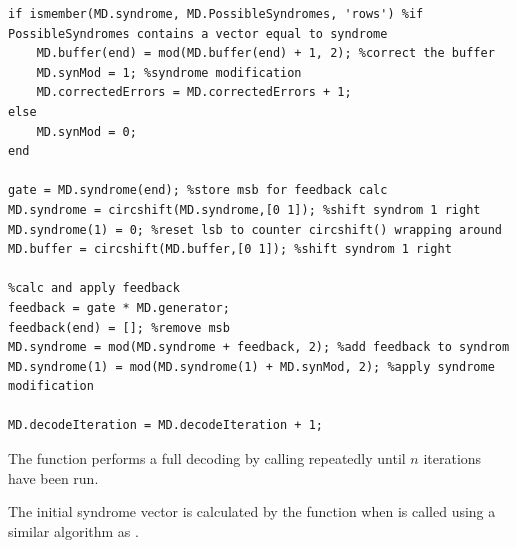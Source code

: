\documentclass[Main]{subfiles}
\begin{document}
\begin{lstlisting}[label={lst:decodeSingleStep},captionpos=b, caption=Decoding a single iteration.] 
%check if the syndrome vector corresponds to an error pattern with 1 as highest bit
if ismember(MD.syndrome, MD.PossibleSyndromes, 'rows') %if PossibleSyndromes contains a vector equal to syndrome
	MD.buffer(end) = mod(MD.buffer(end) + 1, 2); %correct the buffer
	MD.synMod = 1; %syndrome modification
	MD.correctedErrors = MD.correctedErrors + 1;
else
	MD.synMod = 0;
end
  
gate = MD.syndrome(end); %store msb for feedback calc
MD.syndrome = circshift(MD.syndrome,[0 1]); %shift syndrom 1 right
MD.syndrome(1) = 0; %reset lsb to counter circshift() wrapping around
MD.buffer = circshift(MD.buffer,[0 1]); %shift syndrom 1 right    

%calc and apply feedback
feedback = gate * MD.generator;
feedback(end) = []; %remove msb
MD.syndrome = mod(MD.syndrome + feedback, 2); %add feedback to syndrom
MD.syndrome(1) = mod(MD.syndrome(1) + MD.synMod, 2); %apply syndrome modification

MD.decodeIteration = MD.decodeIteration + 1;
\end{lstlisting}

The function  performs a full decoding by calling  repeatedly until $n$ iterations have been run.

The initial syndrome vector is calculated by the function   when  is called using a similar algorithm as .
\end{document}
